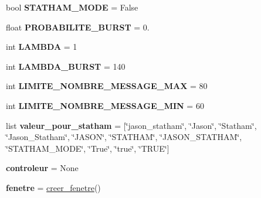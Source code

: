 \begin{DoxyCompactItemize}
\item 
bool {\bfseries S\+T\+A\+T\+H\+A\+M\+\_\+\+M\+O\+DE} = False\hypertarget{namespacesimulation__v2_aab37d691b396a795780e2bcff8d24af0}{}\label{namespacesimulation__v2_aab37d691b396a795780e2bcff8d24af0}

\item 
float {\bfseries P\+R\+O\+B\+A\+B\+I\+L\+I\+T\+E\+\_\+\+B\+U\+R\+ST} = 0.\hypertarget{namespacesimulation__v2_a8b7a889f8d469d7e64b97ea31511f63c}{}\label{namespacesimulation__v2_a8b7a889f8d469d7e64b97ea31511f63c}

\item 
int {\bfseries L\+A\+M\+B\+DA} = 1\hypertarget{namespacesimulation__v2_acfb0103c1d6081a239ce1b3547eea7ff}{}\label{namespacesimulation__v2_acfb0103c1d6081a239ce1b3547eea7ff}

\item 
int {\bfseries L\+A\+M\+B\+D\+A\+\_\+\+B\+U\+R\+ST} = 140\hypertarget{namespacesimulation__v2_a44ceb37e8f0820d086e63eabb4c34600}{}\label{namespacesimulation__v2_a44ceb37e8f0820d086e63eabb4c34600}

\item 
int {\bfseries L\+I\+M\+I\+T\+E\+\_\+\+N\+O\+M\+B\+R\+E\+\_\+\+M\+E\+S\+S\+A\+G\+E\+\_\+\+M\+AX} = 80\hypertarget{namespacesimulation__v2_a8acf1290518b6024f92b00dd57cdcc12}{}\label{namespacesimulation__v2_a8acf1290518b6024f92b00dd57cdcc12}

\item 
int {\bfseries L\+I\+M\+I\+T\+E\+\_\+\+N\+O\+M\+B\+R\+E\+\_\+\+M\+E\+S\+S\+A\+G\+E\+\_\+\+M\+IN} = 60\hypertarget{namespacesimulation__v2_a6f82b015795dba974442b6b95d7365be}{}\label{namespacesimulation__v2_a6f82b015795dba974442b6b95d7365be}

\item 
list {\bfseries valeur\+\_\+pour\+\_\+statham} = \mbox{[}\char`\"{}jason\+\_\+statham\char`\"{}, \char`\"{}Jason\char`\"{}, \char`\"{}Statham\char`\"{}, \char`\"{}Jason\+\_\+\+Statham\char`\"{}, \char`\"{}J\+A\+S\+ON\char`\"{}, \char`\"{}S\+T\+A\+T\+H\+AM\char`\"{}, \char`\"{}J\+A\+S\+O\+N\+\_\+\+S\+T\+A\+T\+H\+AM\char`\"{}, \char`\"{}S\+T\+A\+T\+H\+A\+M\+\_\+\+M\+O\+DE\char`\"{}, \char`\"{}True\char`\"{}, \char`\"{}true\char`\"{}, \char`\"{}T\+R\+UE\char`\"{}\mbox{]}\hypertarget{namespacesimulation__v2_a4ed87b734c7e85640794727500df7a40}{}\label{namespacesimulation__v2_a4ed87b734c7e85640794727500df7a40}

\item 
{\bfseries controleur} = None\hypertarget{namespacesimulation__v2_a1474bf4051690c0dbfbbbeaacd94bd4d}{}\label{namespacesimulation__v2_a1474bf4051690c0dbfbbbeaacd94bd4d}

\item 
{\bfseries fenetre} = \hyperlink{namespacesimulation__v2_a10832edd42c140de23ebbf784212e7da}{creer\+\_\+fenetre}()\hypertarget{namespacesimulation__v2_a88a5ce93cfa05f797b660f21f23e50a8}{}\label{namespacesimulation__v2_a88a5ce93cfa05f797b660f21f23e50a8}

\end{DoxyCompactItemize}


